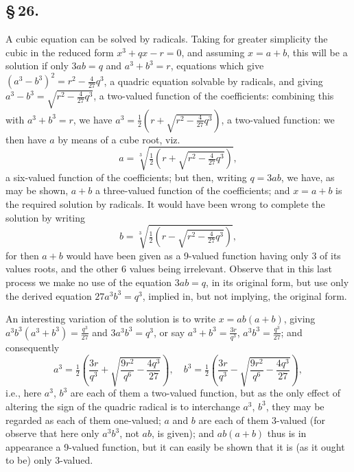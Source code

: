 \documentclass[11pt,a4paper]{article}
\begin{document}
\subsection*{\S\,26.}

A cubic equation can be solved by radicals. Taking for greater simplicity the cubic in the reduced form $x^{3} + qx - r = 0$, and assuming $x = a + b$, this will be a solution if only $3ab = q$ and $a^{3} + b^{3} = r$, equations which give $(a^{3} - b^{3})^{2} = r^{2} - \frac{4}{27}q^{3}$, a quadric equation solvable by radicals, and giving $a^{3} - b^{3} = \sqrt{r^{2} - \frac{4}{27}q^{3}}$, a two-valued function of the coefficients: combining this with $a^{3} + b^{3} = r$, we have $a^{3} = \frac{1}{2}(r + \sqrt{r^{2} - \frac{4}{27}q^{3}})$, a two-valued function: we then have $a$ by means of a cube root, viz.
\[
a = \sqrt[3]{\tfrac{1}{2}(r + \sqrt{r^{2} - \tfrac{4}{27}q^{3}})},
\]
a six-valued function of the coefficients; but then, writing $q = 3ab$, we have, as may be shown, $a + b$ a three-valued function of the coefficients; and $x = a + b$ is the required solution by radicals. It would have been wrong to complete the solution by writing
\[
b = \sqrt[3]{\tfrac{1}{2}(r - \sqrt{r^{2} - \tfrac{4}{27}q^{3}})},
\]
for then $a + b$ would have been given as a 9-valued function having only 3 of its values roots, and the other 6 values being irrelevant. Observe that in this last process we make no use of the equation $3ab = q$, in its original form, but use only the derived equation $27a^{3}b^{3} = q^{3}$, implied in, but not implying, the original form.

An interesting variation of the solution is to write $x = ab(a + b)$, giving $a^{3}b^{3}(a^{3} + b^{3}) = \frac{q^{3}}{27}$ and $3a^{3}b^{3} = q^{3}$, or say $a^{3} + b^{3} = \frac{3r}{q^{3}}$, $a^{3}b^{3} = \frac{q^{3}}{27}$; and consequently
\[
a^{3} = \tfrac{1}{2}\left(\frac{3r}{q^{3}} + \sqrt{\frac{9r^{2}}{q^{6}} - \frac{4q^{3}}{27}}\right), \quad b^{3} = \tfrac{1}{2}\left(\frac{3r}{q^{3}} - \sqrt{\frac{9r^{2}}{q^{6}} - \frac{4q^{3}}{27}}\right),
\]
i.e., here $a^{3}$, $b^{3}$ are each of them a two-valued function, but as the only effect of altering the sign of the quadric radical is to interchange $a^{3}$, $b^{3}$, they may be regarded as each of them one-valued; $a$ and $b$ are each of them 3-valued (for observe that here only $a^{3}b^{3}$, not $ab$, is given); and $ab(a + b)$ thus is in appearance a 9-valued function, but it can easily be shown that it is (as it ought to be) only 3-valued.
\end{document}
